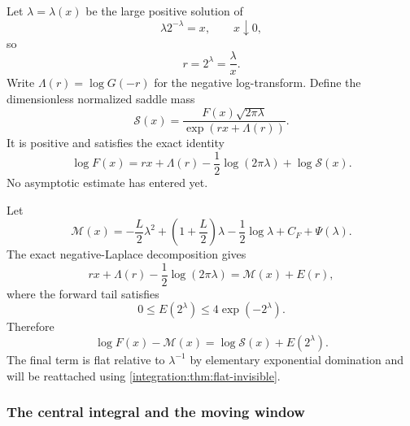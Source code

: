\documentclass[11pt,oneside]{article}
\theoremstyle{definition}
\theoremstyle{remark}
\begin{document}
Let $\lambda=\lambda(x)$ be the large positive solution of
\begin{equation}
 \lambda2^{-\lambda}=x,
 \qquad x\downarrow0,
 \label{integration:eq:exact-lambert-phase}
\end{equation}
so
\begin{equation}
 r=2^\lambda=\frac{\lambda}{x}.
 \label{integration:eq:saddle-radius-r}
\end{equation}
Write $\Lambda(r)=\log G(-r)$ for the negative log-transform.  Define the dimensionless
normalized saddle mass
\begin{equation}
 \mathcal S(x)=
 \frac{F(x)\sqrt{2\pi\lambda}}
      {\exp(rx+\Lambda(r))}.
 \label{integration:eq:normalized-saddle-mass}
\end{equation}
It is positive and satisfies the exact identity
\begin{equation}
 \log F(x)=rx+\Lambda(r)-\frac12\log(2\pi\lambda)+\log\mathcal S(x).
 \label{integration:eq:exact-log-saddle-supp}
\end{equation}
No asymptotic estimate has entered yet.

Let
\begin{equation}
 \mathcal M(x)=
 -\frac L2\lambda^2+
 \left(1+\frac L2\right)\lambda-\frac12\log\lambda
 +C_F+\Psi(\lambda).
 \label{integration:eq:sharp-main-supp}
\end{equation}
The exact negative-Laplace decomposition gives
\begin{equation}
 rx+\Lambda(r)-\frac12\log(2\pi\lambda)
 =\mathcal M(x)+E(r),
 \label{integration:eq:exact-main-tail-supp}
\end{equation}
where the forward tail satisfies
\begin{equation}
 0\le E(2^\lambda)\le4\exp(-2^\lambda).
 \label{integration:eq:forward-tail-flat-supp}
\end{equation}
Therefore
\begin{equation}
 \log F(x)-\mathcal M(x)=\log\mathcal S(x)+E(2^\lambda).
 \label{integration:eq:exact-error-separation-supp}
\end{equation}
The final term is flat relative to $\lambda^{-1}$ by elementary exponential domination and
will be reattached using \cref{integration:thm:flat-invisible}.

\subsubsection{The central integral and the moving window}
\end{document}
